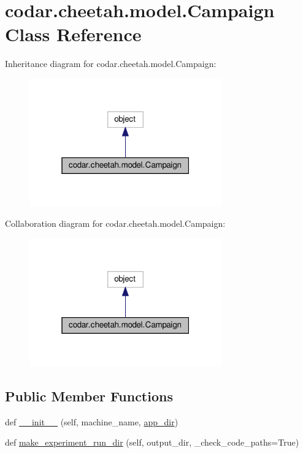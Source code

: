 \hypertarget{classcodar_1_1cheetah_1_1model_1_1_campaign}{}\section{codar.\+cheetah.\+model.\+Campaign Class Reference}
\label{classcodar_1_1cheetah_1_1model_1_1_campaign}


Inheritance diagram for codar.\+cheetah.\+model.\+Campaign\+:
\nopagebreak
\begin{figure}[H]
\begin{center}
\leavevmode
\includegraphics[width=235pt]{classcodar_1_1cheetah_1_1model_1_1_campaign__inherit__graph}
\end{center}
\end{figure}


Collaboration diagram for codar.\+cheetah.\+model.\+Campaign\+:
\nopagebreak
\begin{figure}[H]
\begin{center}
\leavevmode
\includegraphics[width=235pt]{classcodar_1_1cheetah_1_1model_1_1_campaign__coll__graph}
\end{center}
\end{figure}
\subsection*{Public Member Functions}
\begin{DoxyCompactItemize}
\item 
def \hyperlink{classcodar_1_1cheetah_1_1model_1_1_campaign_ad1b15b5ae37794b2568fe8460f36eab6}{\+\_\+\+\_\+init\+\_\+\+\_\+} (self, machine\+\_\+name, \hyperlink{classcodar_1_1cheetah_1_1model_1_1_campaign_a0d0c15af5ad8c345542eeba939f15ef6}{app\+\_\+dir})
\item 
def \hyperlink{classcodar_1_1cheetah_1_1model_1_1_campaign_a09266b3421f37a82d8e12c1272e3f54b}{make\+\_\+experiment\+\_\+run\+\_\+dir} (self, output\+\_\+dir, \+\_\+check\+\_\+code\+\_\+paths=True)
\end{DoxyCompactItemize}
